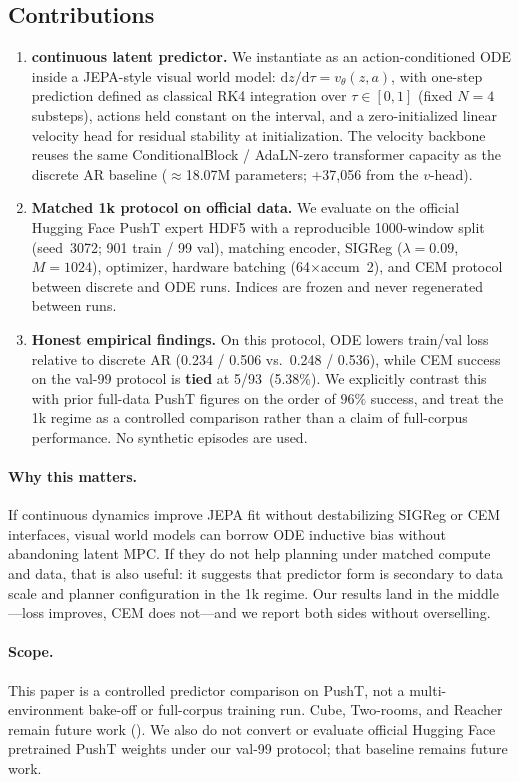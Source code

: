 \subsection{Contributions}
\label{sec:contributions}

\begin{enumerate}[leftmargin=*,itemsep=3pt]
\item \textbf{\method{} continuous latent predictor.}
We instantiate \method{} as an action-conditioned ODE inside a
JEPA-style visual world model:
$\mathrm{d}z/\mathrm{d}\tau = v_\theta(z,a)$, with one-step prediction
defined as classical RK4 integration over $\tau\in[0,1]$ (fixed
$N{=}4$ substeps), actions held constant on the interval, and a
zero-initialized linear velocity head for residual stability at
initialization.
The velocity backbone reuses the same ConditionalBlock / AdaLN-zero
transformer capacity as the discrete AR baseline
($\approx$18.07M parameters; +37{,}056 from the $v$-head).

\item \textbf{Matched 1k protocol on official data.}
We evaluate on the official Hugging Face PushT expert HDF5 with a
reproducible 1000-window split (seed~3072; 901 train / 99 val),
matching encoder, SIGReg ($\lambda{=}0.09$, $M{=}1024$), optimizer,
hardware batching (64$\times$accum~2), and CEM protocol between
discrete and ODE runs.
Indices are frozen and never regenerated between runs.

\item \textbf{Honest empirical findings.}
On this protocol, ODE lowers train/val loss relative to discrete AR
(0.234 / 0.506 vs.\ 0.248 / 0.536), while CEM success on the val-99
protocol is \textbf{tied} at 5/93~(5.38\%).
We explicitly contrast this with prior full-data PushT figures on the
order of $96\%$ success, and treat the 1k regime as a controlled
comparison rather than a claim of full-corpus performance.
No synthetic episodes are used.
\end{enumerate}

\paragraph{Why this matters.}
If continuous dynamics improve JEPA fit without destabilizing SIGReg or
CEM interfaces, visual world models can borrow ODE inductive bias without
abandoning latent MPC.
If they do not help planning under matched compute and data, that is
also useful: it suggests that predictor form is secondary to data scale
and planner configuration in the 1k regime.
Our results land in the middle---loss improves, CEM does not---and we
report both sides without overselling.

\paragraph{Scope.}
This paper is a controlled predictor comparison on PushT, not a
multi-environment bake-off or full-corpus training run.
Cube, Two-rooms, and Reacher remain future work
().
We also do not convert or evaluate official Hugging Face pretrained
PushT weights under our val-99 protocol; that baseline remains future
work.
